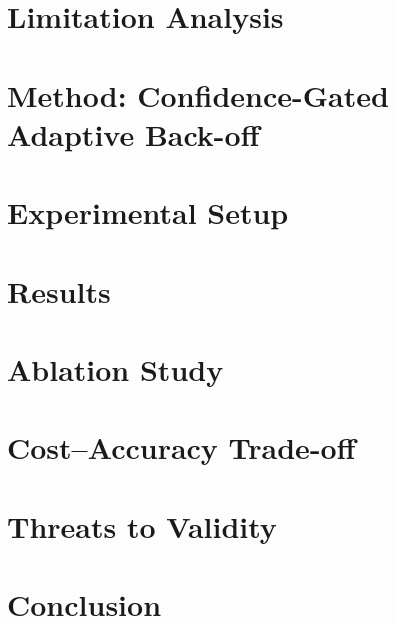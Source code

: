 \documentclass[sigconf,nonacm]{acmart}
\begin{document}
\section{Limitation Analysis}


\section{Method: Confidence-Gated Adaptive Back-off}


\section{Experimental Setup}
\label{sec:setup}


\section{Results}


\section{Ablation Study}


\section{Cost--Accuracy Trade-off}


\section{Threats to Validity}


\section{Conclusion}




\end{document}
